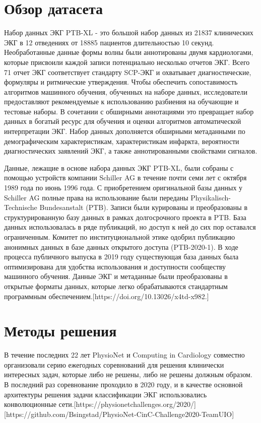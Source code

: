 \documentclass[oneside,final,14pt]{extreport}
\begin{document}
\section{Обзор датасета}
Набор данных ЭКГ PTB-XL - это большой набор данных из 21837 клинических ЭКГ в 12 отведениях от 18885 пациентов длительностью 10 секунд. Необработанные данные формы волны были аннотированы двумя кардиологами, которые присвоили каждой записи потенциально несколько отчетов ЭКГ. Всего 71 отчет ЭКГ соответствует стандарту SCP-ЭКГ и охватывает диагностические, формуляры и ритмические утверждения. Чтобы обеспечить сопоставимость алгоритмов машинного обучения, обученных на наборе данных, исследователи предоставляют рекомендуемые к использованию разбиения на обучающие и тестовые наборы. В сочетании с обширными аннотациями это превращает набор данных в богатый ресурс для обучения и оценки алгоритмов автоматической интерпретации ЭКГ. Набор данных дополняется обширными метаданными по демографическим характеристикам, характеристикам инфаркта, вероятности диагностических заявлений ЭКГ, а также аннотированными свойствами сигналов.

Данные, лежащие в основе набора данных ЭКГ PTB-XL, были собраны с помощью устройств компании Schiller AG в течение почти семи лет с октября 1989 года по июнь 1996 года. С приобретением оригинальной базы данных у Schiller AG полные права на использование были переданы Physikalisch-Technische Bundesanstalt (PTB). Записи были курированы и преобразованы в структурированную базу данных в рамках долгосрочного проекта в  PTB. База данных использовалась в ряде публикаций, но доступ к ней до сих пор оставался ограниченным. Комитет по институциональной этике одобрил публикацию анонимных данных в базе данных открытого доступа (PTB-2020-1). В ходе процесса публичного выпуска в 2019 году существующая база данных была оптимизирована для удобства использования и доступности сообществу машинного обучения. Данные ЭКГ и метаданные были преобразованы в открытые форматы данных, которые легко обрабатываются стандартным программным обеспечением.[https://doi.org/10.13026/x4td-x982.]
\section{Методы решения}
В течение последних 22 лет PhysioNet и Computing in Cardiology совместно организовали серию ежегодных соревнований для решения клинически интересных задач, которые либо не решены, либо не решены должным образом. В последний раз соревнование проходило в 2020 году, и в качестве основной архитектуры решения задачи классификации ЭКГ использовались конволюционные сети.[https://physionetchallenges.org/2020/][https://github.com/Bsingstad/PhysioNet-CinC-Challenge2020-TeamUIO]
\end{document}

